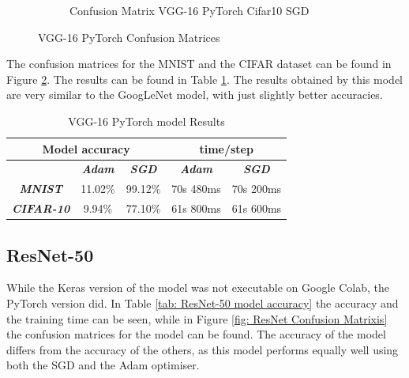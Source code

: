 \documentclass[conference]{IEEEtran}
\begin{document}
\begin{figure}[!htbp]
\begin{subfigure}[b]{0.22\textwidth}
        \caption{Confusion Matrix VGG-16 PyTorch Cifar10 SGD}
        \label{fig:x matrix_VGG-16_PyTorch_CIFAR_SGD}
    \end{subfigure}
    \caption{VGG-16 PyTorch Confusion Matrices}
    \label{fig: VGG-16 PyTorch Confusion Matrixis}
\end{figure}

The confusion matrices for the MNIST and the CIFAR dataset can be found in Figure \ref{fig: VGG-16 PyTorch Confusion Matrixis}.
The results can be found in Table \ref{tab: VGG-16 PyTorch model accuracy}.
The results obtained by this model are very similar to the GoogLeNet model, with just slightly better accuracies.

\begin{table}[!htbp]
    \caption{VGG-16 PyTorch model Results}
    \begin{center}
    \begin{tabular}{|c|c|c|c|c|}
    \cline{1-5} 
    \multicolumn{3}{|c|}{\textbf{Model accuracy}} & \multicolumn{2}{|c|}{\textbf{time/step}} \\
    \hline 
    \textit{} & \textbf{\textit{Adam}} & \textbf{\textit{SGD}} & \textbf{\textit{Adam}} & \textbf{\textit{SGD}} \\
    \hline
    \textbf{\textit{MNIST}} & 11.02\% & 99.12\% & 70s 480ms & 70s 200ms  \\
    \hline
    \textbf{\textit{CIFAR-10}} & 9.94\% & 77.10\% & 61s 800ms & 61s 600ms \\
    \cline{1-5} 
    \end{tabular}
    \label{tab: VGG-16 PyTorch model accuracy}
    \end{center}
\end{table}

\subsection{ResNet-50}
While the Keras version of the model was not executable on Google Colab, the PyTorch version did.
In Table \ref{tab: ResNet-50 model accuracy} the accuracy and the training time can be seen, while in Figure \ref{fig: ResNet Confusion Matrixis} the confusion matrices for the model can be found.
The accuracy of the model differs from the accuracy of the others, as this model performs equally well using both the SGD and the Adam optimiser.
\end{document}
